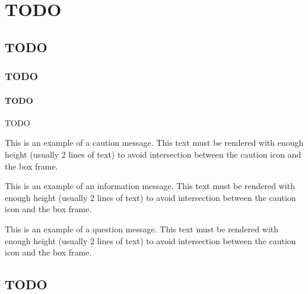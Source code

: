 \documentclass[11pt, book, english, french]{upmethodology-document}
\begin{document}
	\chapter{TODO}
		\section{TODO}
			\subsection{TODO}
				\subsubsection{TODO}
						TODO
						\begin{upmcaution}
							This is an example of a caution message. This text must be rendered with enough height (usually 2 lines of text) to avoid intersection between the caution icon and the box frame.
						\end{upmcaution}
						\begin{upminfo}
							This is an example of an information message. This text must be rendered with enough height (usually 2 lines of text) to avoid intersection between the caution icon and the box frame.
						\end{upminfo}
						\begin{upmquestion}
							This is an example of a question message. This text must be rendered with enough height (usually 2 lines of text) to avoid intersection between the caution icon and the box frame.
						\end{upmquestion}
	\nocite{*}
	
	
		\setcounter{section}{0}
		\renewcommand{\thesection}{\Alph{section}}
		\renewcommand{\theHsection}{appendixsection.\Alph{section}}
		\section{TODO}
\end{document}
